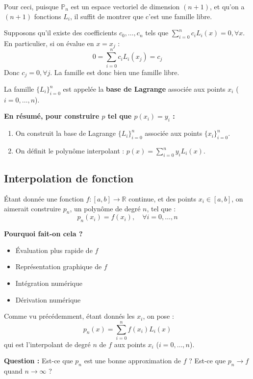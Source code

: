 Pour ceci, puisque $\mathbb{P}_n$ est un espace vectoriel de dimension $(n+1)$, et qu'on a $(n+1)$ fonctions $L_i$, il suffit de montrer que c'est une famille libre.

\begin{explication}
Supposons qu'il existe des coefficients $c_0, \dots, c_n$ tels que $\sum_{i=0}^n c_i L_i(x) = 0, \forall x$. \\
En particulier, si on évalue en $x = x_j$ :
$$0 = \sum_{i=0}^n c_i L_i(x_j) = c_j$$
Donc $c_j = 0, \forall j$. La famille est donc bien une famille libre.
\end{explication}

La famille $\{L_i\}_{i=0}^n$ est appelée la \textbf{base de Lagrange} associée aux points $x_i$ ($i=0,\dots,n$).

\textbf{En résumé, pour construire $p$ tel que $p(x_i) = y_i$ :}
\begin{enumerate}
    \item On construit la base de Lagrange $\{L_i\}_{i=0}^n$ associée aux points $\{x_i\}_{i=0}^n$.
    \item On définit le polynôme interpolant : $p(x) = \sum_{i=0}^n y_i L_i(x)$.
\end{enumerate}

\subsection{Interpolation de fonction}

Étant donnée une fonction $f : [a, b] \to \mathbb{R}$ continue, et des points $x_i \in [a, b]$, on aimerait construire $p_n$, un polynôme de degré $n$, tel que :
$$p_n(x_i) = f(x_i), \quad \forall i = 0, \dots, n$$

\textbf{Pourquoi fait-on cela ?}
\begin{itemize}
    \item Évaluation plus rapide de $f$
    \item Représentation graphique de $f$
    \item Intégration numérique
    \item Dérivation numérique
\end{itemize}

Comme vu précédemment, étant donnés les $x_i$, on pose :
$$p_n(x) = \sum_{i=0}^n f(x_i) L_i(x)$$
qui est l'interpolant de degré $n$ de $f$ aux points $x_i$ ($i=0,\dots,n$).

\textbf{Question :} Est-ce que $p_n$ est une bonne approximation de $f$ ? Est-ce que $p_n \to f$ quand $n \to \infty$ ?

